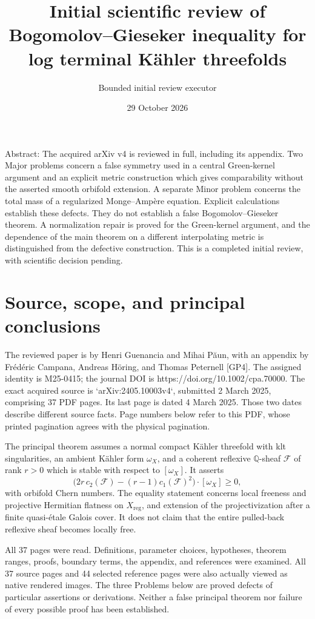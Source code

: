 \documentclass[10pt]{article}
\title{Initial scientific review of
Bogomolov–Gieseker inequality for log terminal Kähler threefolds}
\author{Bounded initial review executor}
\date{29 October 2026}
\begin{document}
\maketitle
Abstract: The acquired arXiv v4 is reviewed in full, including its appendix. Two Major problems concern a false symmetry used in a central Green-kernel argument and an explicit metric construction which gives comparability without the asserted smooth orbifold extension. A separate Minor problem concerns the total mass of a regularized Monge–Ampère equation. Explicit calculations establish these defects. They do not establish a false Bogomolov–Gieseker theorem. A normalization repair is proved for the Green-kernel argument, and the dependence of the main theorem on a different interpolating metric is distinguished from the defective construction. This is a completed initial review, with scientific decision pending.\par
\section*{Source, scope, and principal conclusions}
The reviewed paper is by Henri Guenancia and Mihai Păun, with an appendix by Frédéric Campana, Andreas Höring, and Thomas Peternell [GP4]. The assigned identity is M25-0415; the journal DOI is https://doi.org/10.1002/cpa.70000. The exact acquired source is `arXiv:2405.10003v4`, submitted 2 March 2025, comprising 37 PDF pages. Its last page is dated 4 March 2025. Those two dates describe different source facts. Page numbers below refer to this PDF, whose printed pagination agrees with the physical pagination.\par
The principal theorem assumes a normal compact Kähler threefold with klt singularities, an ambient Kähler form \(\omega_X\), and a coherent reflexive \(\mathbb Q\)-sheaf \(\mathcal F\) of rank \(r>0\) which is stable with respect to \([\omega_X]\). It asserts \[\bigl(2r\,c_2(\mathcal F)-(r-1)c_1(\mathcal F)^2\bigr)\cdot[\omega_X]\geq0,\] with orbifold Chern numbers. The equality statement concerns local freeness and projective Hermitian flatness on \(X_{\mathrm{reg}}\), and extension of the projectivization after a finite quasi-étale Galois cover. It does not claim that the entire pulled-back reflexive sheaf becomes locally free.\par
All 37 pages were read. Definitions, parameter choices, hypotheses, theorem ranges, proofs, boundary terms, the appendix, and references were examined. All 37 source pages and 44 selected reference pages were also actually viewed as native rendered images. The three Problems below are proved defects of particular assertions or derivations. Neither a false principal theorem nor failure of every possible proof has been established.\par
\end{document}
